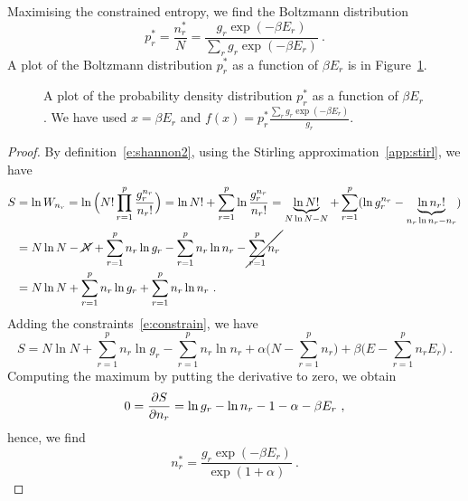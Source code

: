     Maximising the constrained entropy, we find the Boltzmann distribution 
    \begin{equation*}
        p_r^* = \frac{n_r^*}{N} = \frac{g_r \exp(- \beta E_r)}{\sum_r g_r \exp(- \beta E_r)} ~.
    \end{equation*}
    A plot of the Boltzmann distribution $p_r^*$ as a function of $\beta E_r$ is in Figure~\ref{en:bol}.
    \begin{figure}
        \centering
        \caption{A plot of the probability density distribution $p_r^*$ as a function of $\beta E_r$. We have used $x = \beta E_r$ and $f(x) = p_r^* \frac{\sum_r g_r \exp(- \beta E_r)}{g_r}$.}
        \label{en:bol}
    \end{figure}
    \begin{proof}
        By definition~\eqref{e:shannon2}, using the Stirling approximation~\eqref{app:stirl}, we have
        \begin{equation*}
        \begin{aligned}
            S & = \ln W_{n_r} = \ln \Big (N! \prod_{r=1}^p \frac{g_r^{n_r}}{n_r!} \Big) = \ln N! + \sum_{r=1}^p \ln \frac{g_r^{n_r}}{n_r!} = \underbrace{\ln N!}_{N \ln N - N} + \sum_{r=1}^p (\ln g_r^{n_r} - \underbrace{\ln n_r!}_{n_r \ln n_r - n_r} ) \\ & = N \ln N - \cancel{N} + \sum_{r=1}^p n_r \ln g_r - \sum_{r=1}^p n_r \ln n_r - \cancel{\sum_{r=1}^p n_r} \\ & = N \ln N + \sum_{r=1}^p n_r \ln g_r + \sum_{r=1}^p n_r \ln n_r ~.
        \end{aligned}
        \end{equation*}
        Adding the constraints~\eqref{e:constrain}, we have
        \begin{equation*}
            S =  N \ln N + \sum_{r=1}^p n_r \ln g_r - \sum_{r=1}^p n_r \ln n_r + \alpha \Big (N - \sum_{r=1}^p n_r \Big) + \beta \Big (E - \sum_{r=1}^p n_r E_r \Big ) ~.
        \end{equation*}
        Computing the maximum by putting the derivative to zero, we obtain
        \begin{equation*}
            0 = \frac{\partial S}{\partial n_r} = \ln g_r - \ln n_r - 1 - \alpha - \beta E_r ~,
        \end{equation*}
        hence, we find
        \begin{equation*}
            n_r^* = \frac{g_r \exp(- \beta E_r)}{\exp(1 + \alpha)} ~.
        \end{equation*}

\end{proof}
